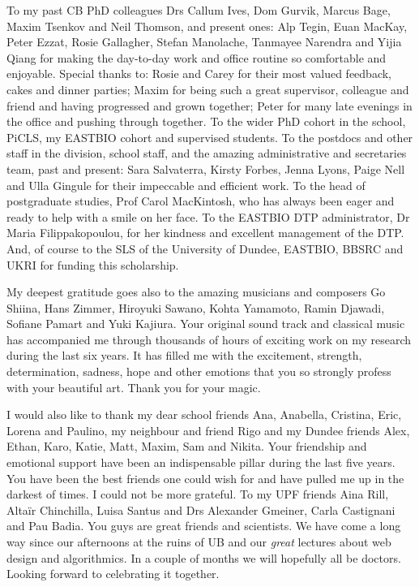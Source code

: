 To my past CB PhD colleagues Drs Callum Ives, Dom Gurvik, Marcus Bage, Maxim Tsenkov and Neil Thomson, and present ones: Alp Tegin, Euan MacKay, Peter Ezzat, Rosie Gallagher, Stefan Manolache, Tanmayee Narendra and Yijia Qiang for making the day-to-day work and office routine so comfortable and enjoyable. Special thanks to: Rosie and Carey for their most valued feedback, cakes and dinner parties; Maxim for being such a great supervisor, colleague and friend and having progressed and grown together; Peter for many late evenings in the office and pushing through together. To the wider PhD cohort in the school, PiCLS, my EASTBIO cohort and supervised students. To the postdocs and other staff in the division, school staff, and the amazing administrative and secretaries team, past and present: Sara Salvaterra, Kirsty Forbes, Jenna Lyons, Paige Nell and Ulla Gingule for their impeccable and efficient work. To the head of postgraduate studies, Prof Carol MacKintosh, who has always been eager and ready to help with a smile on her face. To the EASTBIO DTP administrator, Dr Maria Filippakopoulou, for her kindness and excellent management of the DTP. And, of course to the SLS of the University of Dundee, EASTBIO, BBSRC and UKRI for funding this scholarship.

My deepest gratitude goes also to the amazing musicians and composers Go Shiina, Hans Zimmer, Hiroyuki Sawano, Kohta Yamamoto, Ramin Djawadi, Sofiane Pamart and Yuki Kajiura. Your original sound track and classical music has accompanied me through thousands of hours of exciting work on my research during the last six years. It has filled me with the excitement, strength, determination, sadness, hope and other emotions that you so strongly profess with your beautiful art. Thank you for your magic.

I would also like to thank my dear school friends Ana, Anabella, Cristina, Eric, Lorena and Paulino, my neighbour and friend Rigo and my Dundee friends Alex, Ethan, Karo, Katie, Matt, Maxim, Sam and Nikita. Your friendship and emotional support have been an indispensable pillar during the last five years. You have been the best friends one could wish for and have pulled me up in the darkest of times. I could not be more grateful. To my UPF friends Aina Rill, Altaïr Chinchilla, Luisa Santus and Drs Alexander Gmeiner, Carla Castignani and Pau Badia. You guys are great friends and scientists. We have come a long way since our afternoons at the ruins of UB and our \textit{great} lectures about web design and algorithmics. In a couple of months we will hopefully all be doctors. Looking forward to celebrating it together.

